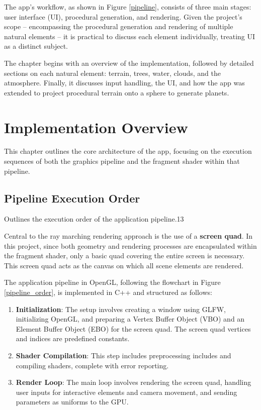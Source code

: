 \label{sec:3}

The app's workflow, as shown in Figure \ref{pipeline}, consists of three main stages: user interface (UI), procedural generation, and rendering. Given the project's scope -- encompassing the procedural generation and rendering of multiple natural elements -- it is practical to discuss each element individually, treating UI as a distinct subject.

The chapter begins with an overview of the implementation, followed by detailed sections on each natural element: terrain, trees, water, clouds, and the atmosphere. Finally, it discusses input handling, the UI, and how the app was extended to project procedural terrain onto a sphere to generate planets.

\section{Implementation Overview}
\label{Implementation Overview}

This chapter outlines the core architecture of the app, focusing on the execution sequences of both the graphics pipeline and the fragment shader within that pipeline.

\subsection{Pipeline Execution Order}

{Outlines the execution order of the application pipeline.}{13}

Central to the ray marching rendering approach is the use of a \textbf{screen quad}. In this project, since both geometry and rendering processes are encapsulated within the fragment shader, only a basic quad covering the entire screen is necessary. This screen quad acts as the canvas on which all scene elements are rendered.


The application pipeline in OpenGL, following the flowchart in Figure \ref{pipeline_order}, is implemented in C++ and structured as follows:


\begin{enumerate}
    \item \textbf{Initialization}: The setup involves creating a window using GLFW, initializing OpenGL, and preparing a Vertex Buffer Object (VBO) and an Element Buffer Object (EBO) for the screen quad. The screen quad vertices and indices are predefined constants.
    \item \textbf{Shader Compilation}: This step includes preprocessing includes and compiling shaders, complete with error reporting.
    \item \textbf{Render Loop}: The main loop involves rendering the screen quad, handling user inputs for interactive elements and camera movement, and sending parameters as uniforms to the GPU.
\end{enumerate}

